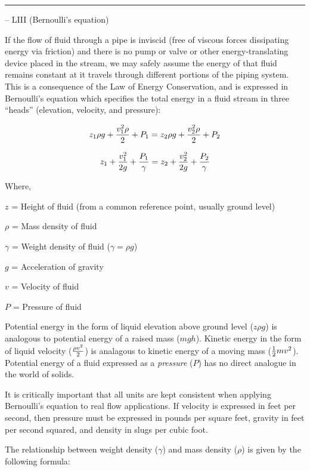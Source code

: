 \filbreak \vskip 5pt \hrule \vskip 5pt  -- LIII (Bernoulli's equation) \vskip 10pt

If the flow of fluid through a pipe is inviscid (free of viscous forces dissipating energy via friction) and there is no pump or valve or other energy-translating device placed in the stream, we may safely assume the energy of that fluid remains constant at it travels through different portions of the piping system.  This is a consequence of the Law of Energy Conservation, and is expressed in Bernoulli's equation which specifies the total energy in a fluid stream in three ``heads'' (elevation, velocity, and pressure):

$$z_1 \rho g + {v_1^2 \rho \over 2} + P_1 = z_2 \rho g + {v_2^2 \rho \over 2} + P_2$$

$$z_1 + {v_1^2 \over {2 g}} + {P_1 \over \gamma} = z_2 + {v_2^2 \over {2 g}} + {P_2 \over \gamma}$$

\noindent
Where,

$z$ = Height of fluid (from a common reference point, usually ground level)

$\rho$ = Mass density of fluid

$\gamma$ = Weight density of fluid ($\gamma = \rho g$)

$g$ = Acceleration of gravity

$v$ = Velocity of fluid

$P$ = Pressure of fluid

\vskip 10pt

Potential energy in the form of liquid elevation above ground level ($z \rho g$) is analogous to potential energy of a raised mass ($mgh$).  Kinetic energy in the form of liquid velocity ($\rho v^2 \over 2$) is analagous to kinetic energy of a moving mass (${1 \over 2} mv^2$).  Potential energy of a fluid expressed as a {\it pressure} ($P$) has no direct analogue in the world of solids.

\vskip 10pt

It is critically important that all units are kept consistent when applying Bernoulli's equation to real flow applications.  If velocity is expressed in feet per second, then pressure must be expressed in pounds per square feet, gravity in feet per second squared, and density in slugs per cubic foot.

\vskip 10pt

The relationship between weight density ($\gamma$) and mass density ($\rho$) is given by the following formula:

